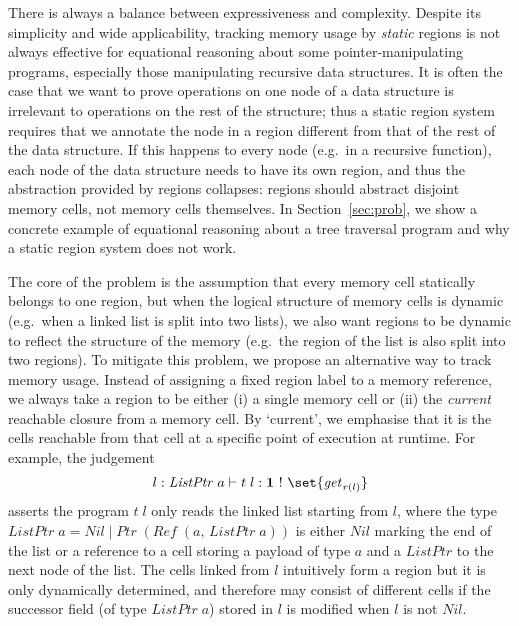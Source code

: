 \documentclass[runningheads]{llncs}
\DeclarePairedDelimiter\set\{\}
\newcommand{\bang}{\,\mathop{!}\,}
\begin{document}
There is always a balance between expressiveness and complexity.
Despite its simplicity and wide applicability, tracking memory usage by \emph{static} regions is not always effective for equational reasoning about some pointer-manipulating programs, especially those manipulating recursive data structures.
It is often the case that we want to prove operations on one node of a data structure is irrelevant to operations on the rest of the structure; thus a static region system requires that we annotate the node in a region different from that of the rest of the data structure.
If this happens to every node (e.g.\ in a recursive function), each node of the data structure needs to have its own region, and thus the abstraction provided by regions collapses: regions should abstract disjoint memory cells, not memory cells themselves.
In Section~\ref{sec:prob}, we show a concrete example of equational reasoning about a tree traversal program and why a static region system does not work.



The core of the problem is the assumption that every memory cell statically belongs to one region, but when the logical structure of memory cells is dynamic (e.g.\ when a linked list is split into two lists), we also want regions to be dynamic to reflect the structure of the memory (e.g.\ the region of the list is also split into two regions).
To mitigate this problem, we propose an alternative way to track memory usage.
Instead of assigning a fixed region label to a memory reference, we always take a region to be either (i) a single memory cell or (ii) the \emph{current} reachable closure from a memory cell.
By `current', we emphasise that it is the cells reachable from that cell at a specific point of execution at runtime.
For example, the judgement
\begin{equation}\label{equ:tvs}
l : \mathit{ListPtr} \; a \vdash t\; l : \mathbf{1} \bang \set{\mathit{get}_{\mathit{r}(l)}}
\end{equation}
asserts the program $t\;l$ only reads the linked list starting from $l$, where the type $\mathit{ListPtr}\;a = \mathit{Nil} \; | \; \mathit{Ptr}\;(\mathit{Ref}\; (a,\,\mathit{ListPtr} \; a))$ is either $\mathit{Nil}$ marking the end of the list or a reference to a cell storing a payload of type $a$ and a $\mathit{ListPtr}$ to the next node of the list.
The cells linked from $l$ intuitively form a region but it is only dynamically determined, and therefore may consist of different cells if the successor field (of type $\mathit{ListPtr}\;a$) stored in $l$ is modified when $l$ is not $\mathit{Nil}$.
\end{document}
